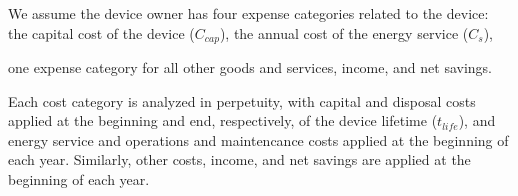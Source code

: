 
We assume the device owner has four expense categories 
related to the device:
the capital cost of the device ($C_{cap}$), 
the annual cost of the energy service ($C_s$), 

one expense category for all other goods and services, 
income, and net savings.


Each cost category is analyzed in perpetuity, with
capital and disposal costs applied at the beginning and end, 
respectively, of the device lifetime ($t_{life}$), and
energy service and operations and maintencance costs
applied at the beginning of each year.
Similarly, other costs, income, and net savings are 
applied at the beginning of each year.


